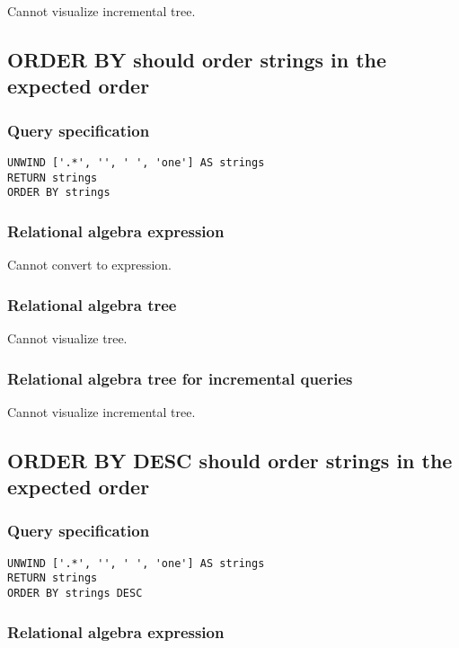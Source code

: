 Cannot visualize incremental tree.

\subsection{ORDER BY should order strings in the expected order}

\subsubsection*{Query specification}

\begin{lstlisting}
UNWIND ['.*', '', ' ', 'one'] AS strings
RETURN strings
ORDER BY strings
\end{lstlisting}

\subsubsection*{Relational algebra expression}

Cannot convert to expression.

\subsubsection*{Relational algebra tree}

Cannot visualize tree.

\subsubsection*{Relational algebra tree for incremental queries}

Cannot visualize incremental tree.

\subsection{ORDER BY DESC should order strings in the expected order}

\subsubsection*{Query specification}

\begin{lstlisting}
UNWIND ['.*', '', ' ', 'one'] AS strings
RETURN strings
ORDER BY strings DESC
\end{lstlisting}

\subsubsection*{Relational algebra expression}

